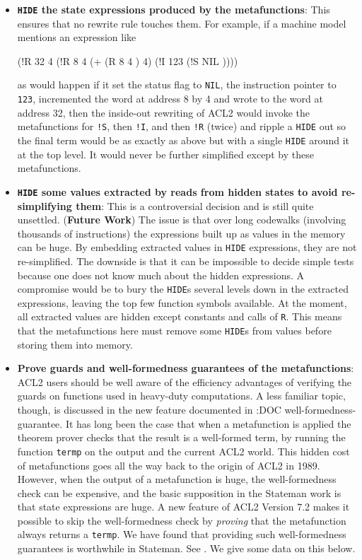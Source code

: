 \documentclass[submission,copyright,creativecommons]{eptcs}
\newcommand{\ptt}[1]{\tt{#1}}
\begin{document}
\begin{itemize}
\item {\bf{{\ptt{HIDE}} the state expressions produced by the
    metafunctions}}: This ensures that no rewrite rule touches them.  For
  example, if a machine model mentions an expression like
\begin{acl2p}
(!R 32 4 
    (!R 8 4 (+ (R 8 4 ) 4)
        (!I 123
            (!S NIL ))))
\end{acl2p}
  as would happen if it set the status flag to {\ptt{NIL}}, the instruction
  pointer to {\ptt{123}}, incremented the word at address 8 by 4 and wrote
   to the word at address 32, then the inside-out rewriting of ACL2 would
  invoke the metafunctions for {\ptt{!S}}, then {\ptt{!I}}, and then
  {\ptt{!R}} (twice) and ripple a {\ptt{HIDE}} out so the final term would be
  as exactly as above but with a single {\ptt{HIDE}} around it at the top
  level.  It would never be further simplified except by these metafunctions.

\item{\bf{{\ptt{HIDE}} some values extracted by reads from hidden states to
    avoid re-simplifying them}}: This is a controversial decision and is
  still quite unsettled.  ({\bf{Future Work}}) The issue is that over long
  codewalks (involving thousands of instructions) the expressions built up as
  values in the memory can be huge.  By embedding extracted values in
  {\ptt{HIDE}} expressions, they are not re-simplified.  The downside is that
  it can be impossible to decide simple tests because one does not know much
  about the hidden expressions.  A compromise would be to bury the
  {\ptt{HIDE}}s several levels down in the extracted expressions, leaving the
  top few function symbols available.  At the moment, all extracted values
  are hidden except constants and calls of {\ptt{R}}.  This means that the
  metafunctions here must remove some {\ptt{HIDE}}s from values before
  storing them into memory.

\item {\bf{Prove guards and well-formedness guarantees of the
    metafunctions}}: ACL2 users should be well aware of the efficiency
  advantages of verifying the guards on functions used in heavy-duty
  computations. A less familiar topic, though, is discussed in the new
  feature documented in :DOC well-formedness-guarantee.  It has long been the
  case that when a metafunction is applied the theorem prover checks that the
  result is a well-formed term, by running the function {\ptt{termp}} on the
  output and the current ACL2 world.  This hidden cost of metafunctions goes
  all the way back to the origin of ACL2 in 1989.  However, when the output
  of a metafunction is huge, the well-formedness check can be expensive, and
  the basic supposition in the Stateman work is that state expressions are
  huge.  A new feature of ACL2 Version 7.2 makes it possible to skip the
  well-formedness check by {\em{proving}} that the metafunction always
  returns a {\ptt{termp}}.  We have found that providing such well-formedness
  guarantees is worthwhile in Stateman.  See \cite{wf-guarantee}.
  We give some data on this below.

\end{itemize}
\end{document}
